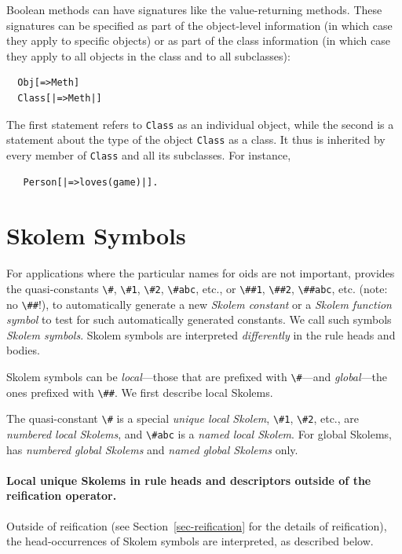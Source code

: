 \documentclass[11pt]{article}
\newcommand{\ERGO}{\mbox{\smaller{\ensuremath{\cal{E}}\smaller{{\sc{RGO}}}}}\xspace}
\newcommand{\FLSYSTEM}{\ERGO}
\begin{document}
Boolean methods can have signatures like the value-returning methods.
These signatures can be specified as part of the object-level information
(in which case they apply to specific objects) or as part of the class
information (in which case they apply to all objects in the class and to
all subclasses):
\begin{verbatim}
  Obj[=>Meth]
  Class[|=>Meth|]
\end{verbatim}
The first statement refers to \texttt{Class} as an individual object, while
the second is a statement about the type of
the object \texttt{Class} as a class.
It thus is inherited by every member of \texttt{Class} and all its
subclasses. 
For instance,
\begin{verbatim}
   Person[|=>loves(game)|].
\end{verbatim}


\section{Skolem Symbols}\label{sec-anon-gen-oids}


%
For applications where the particular names for
oids are not important, \FLSYSTEM provides the
quasi-constants \verb|\#|, \verb|\#1|, \verb|\#2|, \verb|\#abc|, etc.,
or \verb|\##1|, \verb|\##2|, \verb|\##abc|, etc. (note: no \verb|\##|!),
to automatically generate a new
\emph{Skolem constant} or a \emph{Skolem function symbol}
to test for such automatically generated
constants. We call such symbols \emph{Skolem symbols}.   Skolem symbols are
interpreted \emph{differently}
in the rule heads and bodies.

Skolem symbols can be \emph{local}---those that are prefixed with
\verb|\#|---and \emph{global}---the ones prefixed with \verb|\##|.
We first describe local Skolems.

The quasi-constant \verb|\#| is a special \emph{unique local Skolem},
\verb|\#1|, \verb|\#2|, etc., are \emph{numbered local Skolems}, and
\verb|\#abc| is a \emph{named local Skolem}.  
For global Skolems, \FLSYSTEM has \emph{numbered global Skolems} and
\emph{named global Skolems} only.  

\paragraph{Local unique Skolems in rule heads and descriptors outside of the reification
  operator.}
Outside of reification (see
Section~\ref{sec-reification} for the details of reification), the
head-occurrences of Skolem symbols are interpreted, as described below.
\end{document}
